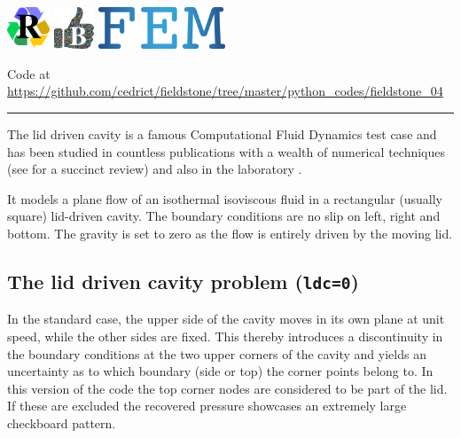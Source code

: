 \includegraphics[height=1.25cm]{images/pictograms/replication}
\includegraphics[height=1.25cm]{images/pictograms/benchmark}
\includegraphics[height=1.25cm]{images/pictograms/FEM}




\begin{center}
Code at \url{https://github.com/cedrict/fieldstone/tree/master/python_codes/fieldstone_04}
\end{center}

\par\noindent\rule{\textwidth}{0.4pt}

The lid driven cavity is a famous Computational Fluid Dynamics test case 
\cite{kawa61,ghgs82,paac67,bope98,brsa06,grdn97,shde00}
and has been studied in countless publications with a wealth of numerical techniques
(see \cite{ertu09} for a succinct review) and also in the laboratory \cite{kost84}.

It models a plane flow of an isothermal isoviscous fluid in a rectangular (usually square) lid-driven cavity. 
The boundary conditions are no slip on left, right and bottom. The gravity is set to zero as the flow
is entirely driven by the moving lid.

\subsection*{The lid driven cavity problem ({\tt ldc=0})}
In the standard case, the upper side of the cavity moves in its own plane at unit speed, while the other sides are fixed.
This thereby introduces a discontinuity in the boundary conditions at the two upper corners of the cavity and yields
an uncertainty as to which boundary (side or top) the corner points belong to. 
In this version of the code the top corner nodes are considered to be part of the lid. If these are excluded 
the recovered pressure showcases an extremely large checkboard pattern.


